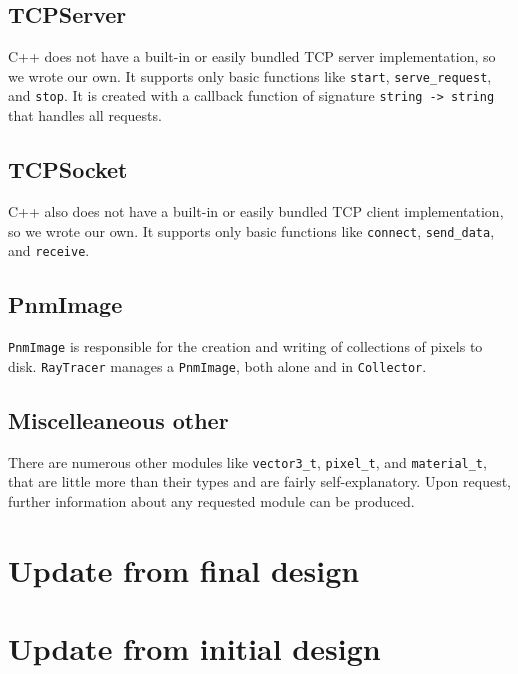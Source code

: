 \documentclass[letterpaper,twocolumn,10pt]{article}
\begin{document}
\subsection{TCPServer}

C++ does not have a built-in or easily bundled TCP server implementation, so we
wrote our own. It supports only basic functions like \verb|start|,
\verb|serve_request|, and \verb|stop|. It is created with a callback function of
signature \verb|string -> string| that handles all requests.

\subsection{TCPSocket}

C++ also does not have a built-in or easily bundled TCP client implementation,
so we wrote our own. It supports only basic functions like \verb|connect|,
\verb|send_data|, and \verb|receive|.

\subsection{PnmImage}

\verb|PnmImage| is responsible for the creation and writing of collections of
pixels to disk. \verb|RayTracer| manages a \verb|PnmImage|, both alone and in
\verb|Collector|.

\subsection{Miscelleaneous other}

There are numerous other modules like \verb|vector3_t|, \verb|pixel_t|, and
\verb|material_t|, that are little more than their types and are fairly
self-explanatory. Upon request, further information about any requested module
can be produced.

\section{Update from final design}



\section{Update from initial design}


\end{document}
